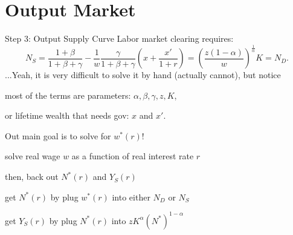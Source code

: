 \documentclass[11pt,aspectratio=169,usenames,dvipsnames]{beamer}
\let\tempone\itemize
\let\temptwo\enditemize
\renewenvironment{itemize}{\tempone\addtolength{\itemsep}{\fill}}{\temptwo}
\begin{document}
\section{Output Market}
\label{sec:Output_Market}

\begin{frame}{Step 3: Output Supply Curve}
\label{slide:Step_3__Output_Supply_Curve}
    Labor market clearing requires:
    \begin{equation*}
        N_{S} = \frac{1+\beta}{1+\beta+\gamma} - \frac{1}{w} \frac{\gamma}{1+\beta+\gamma}
                \left(
                    x + \frac{x'}{1+r}
                \right)
                =
                \left(
                    \frac{z ( 1-\alpha )}{w}
                \right)^{\frac{1}{\alpha}} K
                = N_{D}
    .\end{equation*}
    ...Yeah, it is very difficult to solve it by hand (actually cannot), but notice
    \begin{itemize}
        \item most of the terms are parameters: $ \alpha, \beta, \gamma, z, K $,
        \item or lifetime wealth that needs gov: $ x $ and $ x' $.
        \item Out main goal is to \alert{solve for $ w^{*}( r ) $!}
        \begin{itemize}
            \item solve real wage $ w $ as a function of real interest rate $ r $
            \item then, back out $ N^{*}( r ) $ and $ Y_{S}( r ) $
            \begin{itemize}
                \item get $ N^{*}( r ) $ by plug $ w^{*}( r ) $ into either $ N_{D} $ or $ N_{S} $
                \item get $ Y_{S}( r ) $ by plug $ N^{*}( r ) $ into $ z K^{\alpha} ( N^{*} )^{1-\alpha} $
            \end{itemize}
        \end{itemize}
    \end{itemize}
\end{frame}
\end{document}
